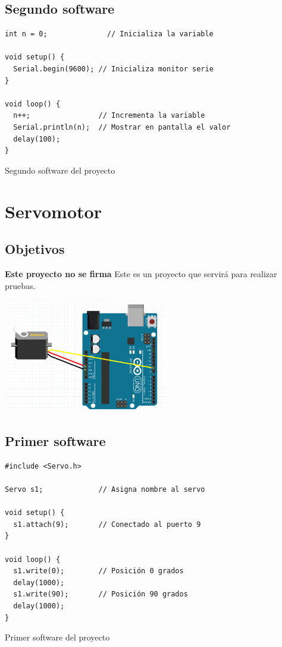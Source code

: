 \documentclass[11pt,spanish,a4paper]{article}
\begin{document}
\subsection{Segundo software}

\begin{listing}[H]
\begin{verbatim}
int n = 0;              // Inicializa la variable

void setup() {
  Serial.begin(9600); // Inicializa monitor serie
}

void loop() {
  n++;                // Incrementa la variable 
  Serial.println(n);  // Mostrar en pantalla el valor
  delay(100);
}
\end{verbatim}
	\caption{Segundo software del proyecto \thesection}
\end{listing}



\newpage
\section{Servomotor}

\subsection{Objetivos}

\textbf{Este proyecto no se firma} Este es un proyecto que servirá para realizar pruebas.

\begin{center}
\includegraphics[height=5cm]{img/06.jpg}
\end{center}

\subsection{Primer software}

\begin{listing}[H]
\begin{verbatim}
#include <Servo.h>

Servo s1;             // Asigna nombre al servo

void setup() {
  s1.attach(9);       // Conectado al puerto 9
}

void loop() {
  s1.write(0);        // Posición 0 grados
  delay(1000);
  s1.write(90);       // Posición 90 grados
  delay(1000);
}
\end{verbatim}
\caption{Primer software del proyecto \thesection}
\end{listing}
\end{document}
